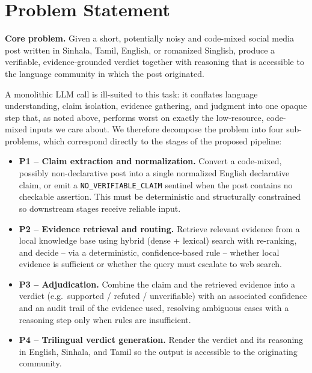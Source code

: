 \documentclass[12pt,a4paper]{article}
\begin{document}
\section{Problem Statement}
\label{sec:problem-statement}
 
\textbf{Core problem.} Given a short, potentially noisy and code-mixed social
media post written in Sinhala, Tamil, English, or romanized Singlish, produce
a verifiable, evidence-grounded verdict together with reasoning that is
accessible to the language community in which the post originated.
 
A monolithic LLM call is ill-suited to this task: it conflates
language understanding, claim isolation, evidence gathering, and judgment
into one opaque step that, as noted above, performs worst on exactly the
low-resource, code-mixed inputs we care about. We therefore decompose the
problem into four sub-problems, which correspond directly to the stages of
the proposed pipeline:
 
\begin{itemize}
  \item \textbf{P1 -- Claim extraction and normalization.} Convert a
  code-mixed, possibly non-declarative post into a single normalized English
  declarative claim, or emit a \texttt{NO\_VERIFIABLE\_CLAIM} sentinel when
  the post contains no checkable assertion. This must be deterministic and
  structurally constrained so downstream stages receive reliable input.
 
  \item \textbf{P2 -- Evidence retrieval and routing.} Retrieve relevant
  evidence from a local knowledge base using hybrid (dense + lexical)
  search with re-ranking, and decide -- via a deterministic,
  confidence-based rule -- whether local evidence is sufficient or whether
  the query must escalate to web search.
 
  \item \textbf{P3 -- Adjudication.} Combine the claim and the retrieved
  evidence into a verdict (e.g.\ supported / refuted / unverifiable) with an
  associated confidence and an audit trail of the evidence used, resolving
  ambiguous cases with a reasoning step only when rules are insufficient.
 
  \item \textbf{P4 -- Trilingual verdict generation.} Render the verdict and
  its reasoning in English, Sinhala, and Tamil so the output is accessible to
  the originating community.
\end{itemize}
\end{document}
